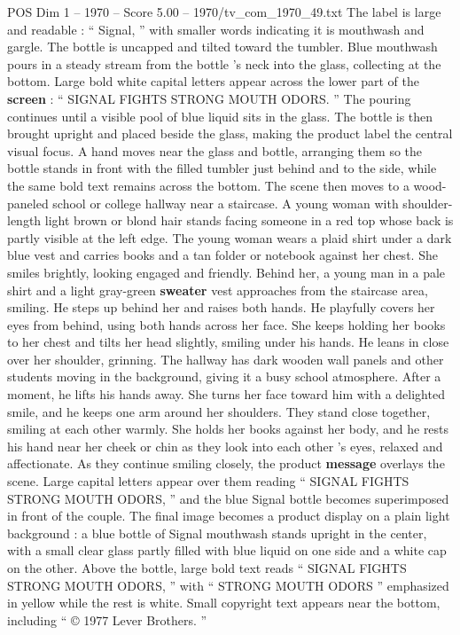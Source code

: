 \begin{textsample}{POS Dim 1 – 1970 – Score 5.00 – 1970/tv\_com\_1970\_49.txt}
The label is large and readable : “ Signal, ” with smaller words indicating it is mouthwash and gargle.
The bottle is uncapped and tilted toward the tumbler.
Blue mouthwash pours in a steady stream from the bottle ’s neck into the glass, collecting at the bottom.
Large bold white capital letters appear across the lower part of the \textbf{screen} : “ SIGNAL FIGHTS STRONG MOUTH ODORS. ” The pouring continues until a visible pool of blue liquid sits in the glass.
The bottle is then brought upright and placed beside the glass, making the product label the central visual focus.
A hand moves near the glass and bottle, arranging them so the bottle stands in front with the filled tumbler just behind and to the side, while the same bold text remains across the bottom.
The scene then moves to a wood-paneled school or college hallway near a staircase.
A young woman with shoulder-length light brown or blond hair stands facing someone in a red top whose back is partly visible at the left edge.
The young woman wears a plaid shirt under a dark blue vest and carries books and a tan folder or notebook against her chest.
She smiles brightly, looking engaged and friendly.
Behind her, a young man in a pale shirt and a light gray-green \textbf{sweater} vest approaches from the staircase area, smiling.
He steps up behind her and raises both hands.
He playfully covers her eyes from behind, using both hands across her face.
She keeps holding her books to her chest and tilts her head slightly, smiling under his hands.
He leans in close over her shoulder, grinning.
The hallway has dark wooden wall panels and other students moving in the background, giving it a busy school atmosphere.
After a moment, he lifts his hands away.
She turns her face toward him with a delighted smile, and he keeps one arm around her shoulders.
They stand close together, smiling at each other warmly.
She holds her books against her body, and he rests his hand near her cheek or chin as they look into each other ’s eyes, relaxed and affectionate.
As they continue smiling closely, the product \textbf{message} overlays the scene.
Large capital letters appear over them reading “ SIGNAL FIGHTS STRONG MOUTH ODORS, ” and the blue Signal bottle becomes superimposed in front of the couple.
The final image becomes a product display on a plain light background : a blue bottle of Signal mouthwash stands upright in the center, with a small clear glass partly filled with blue liquid on one side and a white cap on the other.
Above the bottle, large bold text reads “ SIGNAL FIGHTS STRONG MOUTH ODORS, ” with “ STRONG MOUTH ODORS ” emphasized in yellow while the rest is white.
Small copyright text appears near the bottom, including “ {\EmojiFont ©} 1977 Lever Brothers. ”

\end{textsample}
